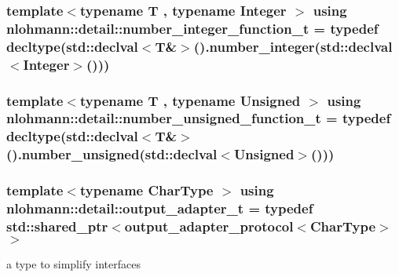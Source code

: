 \subsubsection[{\texorpdfstring{number\+\_\+integer\+\_\+function\+\_\+t}{number_integer_function_t}}]{\setlength{\rightskip}{0pt plus 5cm}template$<$typename T , typename Integer $>$ using {\bf nlohmann\+::detail\+::number\+\_\+integer\+\_\+function\+\_\+t} = typedef decltype(std\+::declval$<$T\&$>$().number\+\_\+integer(std\+::declval$<$Integer$>$()))}\hypertarget{namespacenlohmann_1_1detail_a4a3e14a011b9ea1ff849fc6d2411e6a0}{}\label{namespacenlohmann_1_1detail_a4a3e14a011b9ea1ff849fc6d2411e6a0}
\subsubsection[{\texorpdfstring{number\+\_\+unsigned\+\_\+function\+\_\+t}{number_unsigned_function_t}}]{\setlength{\rightskip}{0pt plus 5cm}template$<$typename T , typename Unsigned $>$ using {\bf nlohmann\+::detail\+::number\+\_\+unsigned\+\_\+function\+\_\+t} = typedef decltype(std\+::declval$<$T\&$>$().number\+\_\+unsigned(std\+::declval$<$Unsigned$>$()))}\hypertarget{namespacenlohmann_1_1detail_a74da7b17bda76f65d276feb18209c913}{}\label{namespacenlohmann_1_1detail_a74da7b17bda76f65d276feb18209c913}
\subsubsection[{\texorpdfstring{output\+\_\+adapter\+\_\+t}{output_adapter_t}}]{\setlength{\rightskip}{0pt plus 5cm}template$<$typename Char\+Type $>$ using {\bf nlohmann\+::detail\+::output\+\_\+adapter\+\_\+t} = typedef std\+::shared\+\_\+ptr$<${\bf output\+\_\+adapter\+\_\+protocol}$<$Char\+Type$>$$>$}\hypertarget{namespacenlohmann_1_1detail_a0fd8edff7729aa2dd92b070964bade2e}{}\label{namespacenlohmann_1_1detail_a0fd8edff7729aa2dd92b070964bade2e}


a type to simplify interfaces 

